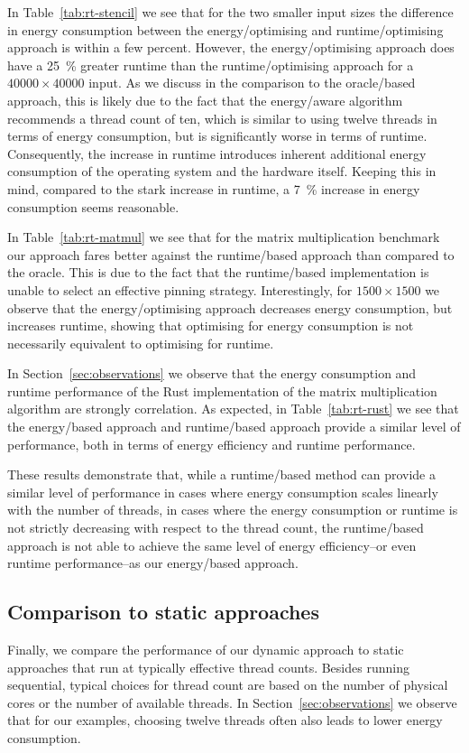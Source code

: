 In Table~\ref{tab:rt-stencil} we see that for the two smaller input sizes the difference in energy consumption between the energy\-/optimising and runtime\-/optimising approach is within a few percent.
However, the energy\-/optimising approach does have a \qty{25}{\percent} greater runtime than the runtime\-/optimising approach for a $40000 \times 40000$ input.
As we discuss in the comparison to the oracle\-/based approach, this is likely due to the fact that the energy\-/aware algorithm recommends a thread count of ten, which is similar to using twelve threads in terms of energy consumption, but is significantly worse in terms of runtime.
Consequently, the increase in runtime introduces inherent additional energy consumption of the operating system and the hardware itself.
Keeping this in mind, compared to the stark increase in runtime, a \qty{7}{\percent} increase in energy consumption seems reasonable.

In Table~\ref{tab:rt-matmul} we see that for the matrix multiplication benchmark our approach fares better against the runtime\-/based approach than compared to the oracle.
This is due to the fact that the runtime\-/based implementation is unable to select an effective pinning strategy.
Interestingly, for $1500 \times 1500$ we observe that the energy\-/optimising approach decreases energy consumption, but increases runtime, showing that optimising for energy consumption is not necessarily equivalent to optimising for runtime.

In Section~\ref{sec:observations} we observe that the energy consumption and runtime performance of the Rust implementation of the matrix multiplication algorithm are strongly correlation.
As expected, in Table~\ref{tab:rt-rust} we see that the energy\-/based approach and runtime\-/based approach provide a similar level of performance, both in terms of energy efficiency and runtime performance.

These results demonstrate that, while a runtime\-/based method can provide a similar level of performance in cases where energy consumption scales linearly with the number of threads, in cases where the energy consumption or runtime is not strictly decreasing with respect to the thread count, the runtime\-/based approach is not able to achieve the same level of energy efficiency\---or even runtime performance\---as our energy\-/based approach.

\subsection{Comparison to static approaches}\label{sec:evaluation-static}
Finally, we compare the performance of our dynamic approach to static approaches that run at typically effective thread counts.
Besides running sequential, typical choices for thread count are based on the number of physical cores or the number of available threads.
In Section~\ref{sec:observations} we observe that for our examples, choosing twelve threads often also leads to lower energy consumption.

